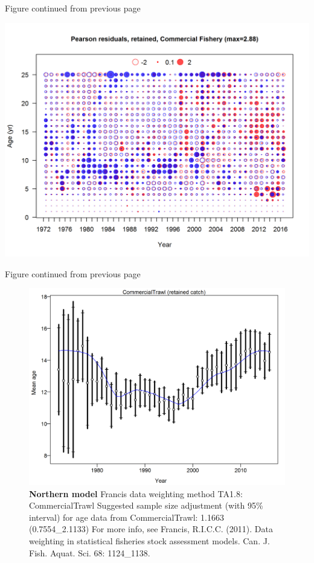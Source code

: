 \documentclass[12pt,]{article}
\begin{document}
\begin{center} 

            Figure continued from previous page 

            \end{center}

\includegraphics{./r4ss/plots_mod1/comp_agefit_residsflt1mkt2_page2.png}

\begin{center} 

            Figure continued from previous page 

            \end{center}

\begin{figure}[htbp]
\centering
\includegraphics{./r4ss/plots_mod1/comp_agefit_data_weighting_TA1.8_CommercialTrawl.png}
\caption{\textbf{Northern model} Francis data weighting method TA1.8:
CommercialTrawl Suggested sample size adjustment (with 95\% interval)
for age data from CommercialTrawl: 1.1663 (0.7554\_2.1133) For more
info, see Francis, R.I.C.C. (2011). Data weighting in statistical
fisheries stock assessment models. Can. J. Fish. Aquat. Sci. 68:
1124\_1138.
\label{fig:mod1_5_comp_agefit_data_weighting_TA1.8_CommercialTrawl}}
\end{figure}
\end{document}

